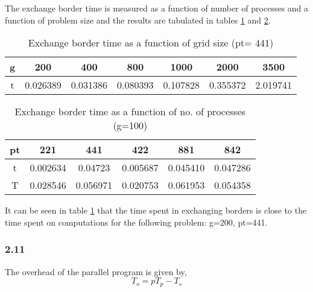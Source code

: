 	The exchange border time is measured as a function of number of processes and a function of problem size and the results are tabulated in tables \ref{exbor} and \ref{exbor2}.
	
	\begin{table}[h!]
          \centering
          \begin{tabular}{|c|c c c c c c|}
            \hline
            g & 200 & 400 & 800	& 1000  & 2000 & 3500 \\
            \hline
            t & 0.026389 & 0.031386 & 0.080393 & 0.107828 & 0.355372 & 2.019741\\
            \hline	
          \end{tabular}
          \caption{Exchange border time as a function of grid size (pt= 441)}
          \label{exbor}
	\end{table}
        
	\begin{table}[h!]
          \centering
          \begin{tabular}{|c|c c c c c|}
            \hline
            pt & 221 & 441 & 422 &881 &842 \\
            \hline
            t & 0.002634 & 0.04723	& 0.005687 & 0.045410 & 0.047286 \\
            T & 0.028546 & 0.056971 & 0.020753 & 0.061953 & 0.054358 \\
            \hline	
          \end{tabular}
          \caption{Exchange border time as a function of no. of processes (g=100)}
          \label{exbor2}
	\end{table}
It can be seen in table \ref{exbor} that the time spent in exchanging borders is close to the time spent on computations for the following problem: g=200, pt=441. 

\subsubsection*{2.11}
The overhead of the parallel program is given by,
\[
  T_o = pT_p - T_s
\]
	
